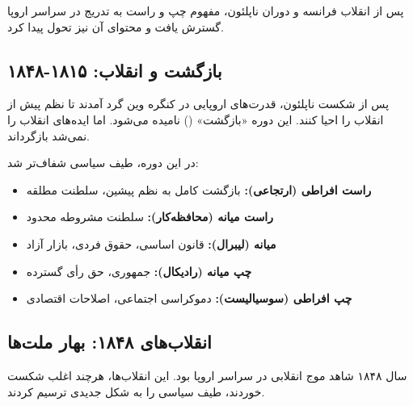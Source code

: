 پس از انقلاب فرانسه و دوران ناپلئون، مفهوم چپ و راست به تدریج در سراسر اروپا گسترش یافت و محتوای آن نیز تحول پیدا کرد.

\subsection{بازگشت و انقلاب: ۱۸۱۵-۱۸۴۸}

\begin{historybox}
پس از شکست ناپلئون، قدرت‌های اروپایی در کنگره وین گرد آمدند تا نظم پیش از انقلاب را احیا کنند. این دوره «بازگشت» () نامیده می‌شود. اما ایده‌های انقلاب را نمی‌شد بازگرداند.
\end{historybox}

در این دوره، طیف سیاسی شفاف‌تر شد:

\begin{itemize}[nosep, rightmargin=1.5cm]
    \item \textbf{راست افراطی (ارتجاعی):} بازگشت کامل به نظم پیشین، سلطنت مطلقه
    \item \textbf{راست میانه (محافظه‌کار):} سلطنت مشروطه محدود
    \item \textbf{میانه (لیبرال):} قانون اساسی، حقوق فردی، بازار آزاد
    \item \textbf{چپ میانه (رادیکال):} جمهوری، حق رأی گسترده
    \item \textbf{چپ افراطی (سوسیالیست):} دموکراسی اجتماعی، اصلاحات اقتصادی
\end{itemize}

\subsection{انقلاب‌های ۱۸۴۸: بهار ملت‌ها}

سال ۱۸۴۸ شاهد موج انقلابی در سراسر اروپا بود. این انقلاب‌ها، هرچند اغلب شکست خوردند، طیف سیاسی را به شکل جدیدی ترسیم کردند.

